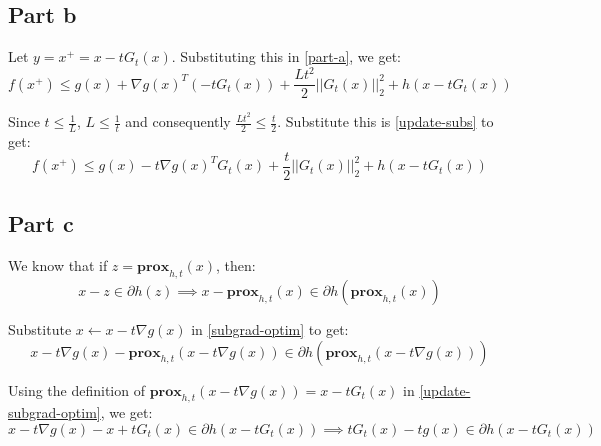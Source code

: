 \documentclass[10.5pt]{article}
\begin{document}
\subsection*{Part b}
\begin{flushleft}
Let \(y = x^{+} = x - tG_{t}(x)\). Substituting this in \ref{part-a}, we get:
\begin{equation}
\label{update-subs}
f(x^{+}) \leq g(x) + \nabla g(x)^{T}(-tG_{t}(x)) + \frac{Lt^{2}}{2}||G_{t}(x)||_{2}^{2} + h\left(x - tG_{t}(x)\right)
\end{equation}

Since \(t \leq \frac{1}{L}\), \(L \leq \frac{1}{t}\) and consequently \(\frac{Lt^2}{2} \leq \frac{t}{2}\). Substitute this is \ref{update-subs} to get:
\begin{equation}
\label{part-b}
f(x^{+}) \leq g(x) - t\nabla g(x)^TG_{t}(x) + \frac{t}{2}||G_{t}(x)||_{2}^{2} + h\left(x - tG_{t}(x)\right)
\end{equation}
\end{flushleft}

\subsection*{Part c}
\begin{flushleft}
We know that if \(z = \textbf{prox}_{h, t}(x)\), then:
\begin{equation}
\label{subgrad-optim}
x - z \in \partial h(z) \implies x - \textbf{prox}_{h, t}(x) \in \partial h(\textbf{prox}_{h, t}(x))
\end{equation}

Substitute \(x \leftarrow x - t\nabla g(x)\) in \ref{subgrad-optim} to get:
\begin{equation}
\label{update-subgrad-optim}
x - t\nabla g(x) - \textbf{prox}_{h, t}(x - t\nabla g(x)) \in \partial h(\textbf{prox}_{h, t}(x - t\nabla g(x)))
\end{equation}

Using the definition of \(\textbf{prox}_{h, t}(x - t\nabla g(x)) = x - tG_{t}(x)\) in \ref{update-subgrad-optim}, we get:
\begin{equation}
\label{part-c}
x - t\nabla g(x) - x + tG_{t}(x) \in \partial h(x - tG_{t}(x)) \implies tG_{t}(x) - tg(x) \in \partial h(x - tG_{t}(x))
\end{equation}
\end{flushleft}
\end{document}
